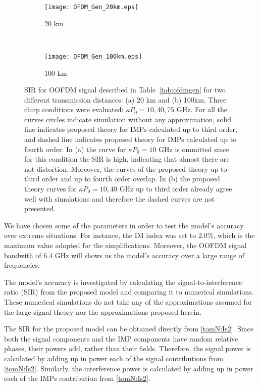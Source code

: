 \documentclass[journal]{IEEEtran}
\begin{document}
\begin{figure*}[bp]
        \centering
        \begin{subfigure}[b]{0.5\textwidth}
                \centering
                \texttt{[image: OFDM\_Gen\_20km.eps]}
                \caption{20 km}
                \label{fig:OFDM_Gen20km}
        \end{subfigure}%
        ~ %
        \begin{subfigure}[b]{0.5\textwidth}
                \centering
                \texttt{[image: OFDM\_Gen\_100km.eps]}
                \caption{100 km}
                \label{fig:OFDM_Gen100km}
        \end{subfigure}
        \caption{SIR for OOFDM signal described in Table~\ref{tab:ofdmgen} for two different transmission distances: (a) 20 km and (b) 100km. Three chirp conditions were evaluated: $\kappa P_0 = 10, 40, 75$ GHz. For all the curves circles indicate simulation without any approximation, solid line indicates proposed theory for IMPs calculated up to third order, and dashed line indicates proposed theory for IMPs calculated up to fourth order. In (a) the curve for $\kappa P_0 = 10$ GHz is ommitted since for this condition the SIR is high, indicating that almost there are not distortion. Moreover, the curves of the proposed theory up to third order and up to fourth order overlap. In (b) the proposed theory curves for $\kappa P_0 = 10, 40$ GHz up to third order already agree well with simulations and therefore the dashed curves are not presented.} \label{fig:SIR}
\end{figure*}

We have chosen some of the parameters in order to test the model's accuracy over extreme situations. For instance, the IM index was set to $2.0\%$, which is the maximum value adopted for the simplifications. Moreover, the OOFDM signal bandwith of 6.4 GHz will shows us the model's accuracy over a large range of frequencies. 

The model's accuracy is investigated by calculating the signal-to-interference ratio (SIR) from the proposed model and comparing it to numerical simulations. These numerical simulations do not take any of the approximations assumed for the large-signal theory nor the approximations proposed herein. 

The SIR for the proposed model can be obtained directly from \eqref{tomN:Is2}. Since both the signal components and the IMP components have random relative phases, their powers add, rather than their fields. Therefore, the signal power is calculated by adding up in power each of the signal contributions from \eqref{tomN:Is2}. Similarly, the interference power is calculated by adding up in power each of the IMPs contribution from \eqref{tomN:Is2}. 
\end{document}
